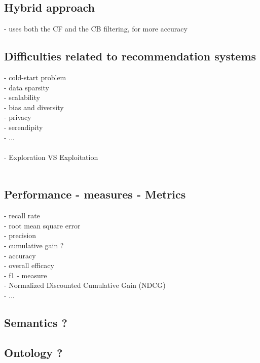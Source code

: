 \documentclass[10pt,oneside,english,a4paper]{article}
\begin{document}
\subsection{Hybrid approach}
- uses both the CF and the CB filtering, for more accuracy




\clearpage
\subsection{Difficulties related to recommendation systems}
- cold-start problem\\
- data sparsity\\
- scalability\\
- bias and diversity\\
- privacy\\
- serendipity\\
- ...\\\\
- Exploration VS Exploitation\\\\


\clearpage
\subsection{Performance - measures - Metrics}
- recall rate\\
- root mean square error\\
- precision\\
- cumulative gain ?\\
- accuracy\\
- overall efficacy\\
- f1 - measure\\
- Normalized Discounted Cumulative Gain (NDCG)\\
- ...\\


\clearpage
\subsection{Semantics ?}

\subsection{Ontology ?}
\end{document}
